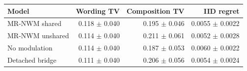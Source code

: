 \begin{tabular}{lrrr}
\toprule
Model & Wording TV & Composition TV & IID regret \\
\midrule
MR-NWM shared & 0.118 $\pm$ 0.040 & 0.195 $\pm$ 0.046 & 0.0055 $\pm$ 0.0022 \\
MR-NWM unshared & 0.114 $\pm$ 0.040 & 0.211 $\pm$ 0.061 & 0.0052 $\pm$ 0.0028 \\
No modulation & 0.114 $\pm$ 0.040 & 0.187 $\pm$ 0.053 & 0.0060 $\pm$ 0.0022 \\
Detached bridge & 0.111 $\pm$ 0.040 & 0.206 $\pm$ 0.056 & 0.0054 $\pm$ 0.0024 \\
\bottomrule
\end{tabular}
